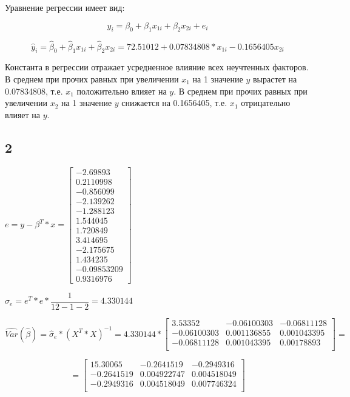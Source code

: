 \documentclass[12pt,a4paper, oneside]{extreport}
\begin{document}
Уравнение регрессии имеет вид: 

$$y_i = \beta_0 + \beta_1 x_{1i}  + \beta_2 x_{2i} + e_i  $$


$$\hat{y}_i = \hat{\beta}_0 + \hat{\beta}_1 x_{1i}  + \hat{\beta}_2 x_{2i}  =  72.51012  + 0.07834808  *  x_{1i} -0.1656405  x_{2i}  $$


Константа в регрессии отражает усредненное влияние всех неучтенных факторов. В среднем при прочих равных при увеличении $x_1$ на 1 значение $y$ вырастет на 
0.07834808, т.е. $x_1$ положительно влияет на $y$.   В среднем при прочих равных при увеличении $x_2$ на 1 значение $y$ снижается на 
0.1656405, т.е. $x_1$ отрицательно  влияет на $y$.  


\subsection*{2}

$e = y - \beta^T*x = \begin{bmatrix} 
-2.69893 \\ 0.2110998 \\ -0.856099 \\ -2.139262 \\ -1.288123 \\ 1.544045 \\ 1.720849 \\ 3.414695 \\ -2.175675 \\ 1.434235 \\ -0.09853209 \\ 0.9316976\end{bmatrix} $

$\hat{\sigma}_e = e^T*e * \dfrac{1}{12-1-2}  =  4.330144 $


\begin{equation}\label{key}
\widehat{Var}(\hat{\beta})  =   \hat{\sigma}_e * (X^T*X)^{-1}  =  4.330144 * 
\begin{bmatrix} 
	3.53352 & -0.06100303 & -0.06811128 \\ 
	-0.06100303 & 0.001136855 & 0.001043395 \\ 
	-0.06811128 & 0.001043395 & 0.00178893 \\ 
\end{bmatrix} =
\end{equation}

\begin{equation}\label{key}
= \begin{bmatrix} 
15.30065 & -0.2641519 & -0.2949316 \\ 
-0.2641519 & 0.004922747 & 0.004518049 \\ 
-0.2949316 & 0.004518049 & 0.007746324 \\ 
\end{bmatrix}
\end{equation}
\end{document}
